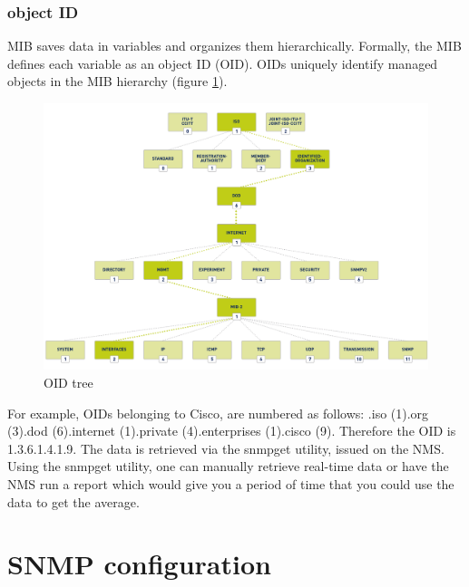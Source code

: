 \subsubsection{object ID}
MIB saves data in variables and organizes them hierarchically. Formally, the MIB defines each variable as an object ID (OID). OIDs uniquely identify managed objects in the MIB hierarchy (figure \ref{OID-tree}).
	\begin{figure}[hbtp]
	\caption{OID tree}\label{OID-tree}
	\centering
	\includegraphics[scale=1]{pictures/OID-tree.png}
	\end{figure}
For example, OIDs belonging to Cisco, are numbered as follows: .iso (1).org (3).dod (6).internet (1).private (4).enterprises (1).cisco (9). Therefore the OID is 1.3.6.1.4.1.9.
The data is retrieved via the snmpget utility, issued on the NMS. Using the snmpget utility, one can manually retrieve real-time data or have the NMS run a report which would give you a period of time that you could use the data to get the average. 
\section{SNMP configuration}
